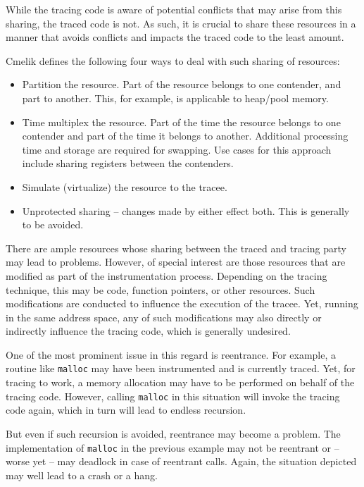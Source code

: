 While the tracing code is aware of potential conflicts that may arise from this sharing, the traced code is not.
As such, it is crucial to share these resources in a manner that avoids conflicts and
impacts the traced code to the least amount.

Cmelik \cite{cmelik94shade} defines the following four ways to deal with such sharing
of resources:
\begin{itemize}
	\item	Partition the resource. Part of the resource belongs to one contender, and
				part to another. This, for example, is applicable to heap/pool memory.
	\item Time multiplex the resource. Part of the time the resource belongs to one contender
				and part of the time it belongs to another. Additional processing time and storage 
				are required for swapping. Use cases for this approach include sharing registers 
				between the contenders.
	\item Simulate (virtualize) the resource to the tracee.
	\item Unprotected sharing -- changes made by either effect both. This is generally to be 
				avoided. 
\end{itemize}
 
There are ample resources whose sharing between the traced and tracing party may lead to problems.
However, of special interest are those resources that are modified as part of the instrumentation 
process. Depending on the tracing technique, this may be code, function pointers, or other resources.
Such modifications are conducted to influence the execution of the tracee. Yet, running 
in the same address space, any of such modifications may also directly or indirectly
influence the tracing code, which is generally undesired. 

One of the most prominent issue in this regard is reentrance. For example, a routine like 
\verb|malloc| may have been instrumented and is currently traced. Yet, for tracing to work, 
a memory allocation may have to be performed on behalf of the tracing code. However, calling 
\verb|malloc| in this situation will invoke the tracing code again, which in turn will lead
to endless recursion.

But even if such recursion is avoided, reentrance may become a problem. The implementation
of \verb|malloc| in the previous example may not be reentrant or -- worse yet -- may 
deadlock in case of reentrant calls. Again, the situation depicted may well lead to
a crash or a hang.

